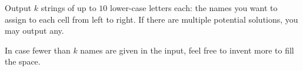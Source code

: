 

Output $k$ strings of up to $10$ lower-case letters each: the names you want
to assign to each cell from left to right.
If there are multiple potential solutions, you may output any.

In case fewer than $k$ names are given in the input, feel free to invent more to
fill the space.
